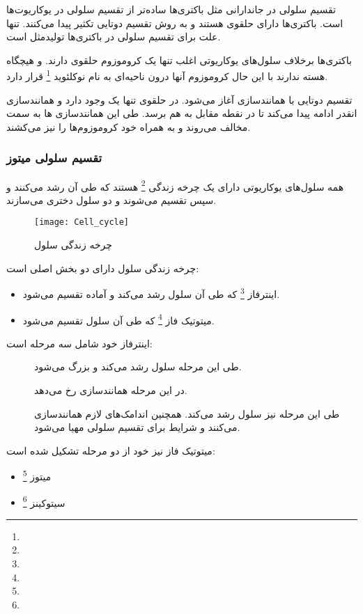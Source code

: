 تقسیم سلولی در جاندارانی مثل باکتری‌ها ساده‌تر از تقسیم سلولی در یوکاریوت‌ها است. باکتری‌ها دارای
حلقوی هستند و به روش تقسیم دوتایی تکثیر پیدا می‌کنند. تنها علت برای تقسیم سلولی در باکتری‌ها تولیدمثل است.

باکتری‌ها برخلاف سلول‌های یوکاریوتی اغلب تنها یک کروموزوم حلقوی دارند. و هیچگاه هسته ندارند با این حال کروموزوم آنها درون ناحیه‌ای به نام نوکلئوید
\footnote{}
قرار دارد.

تقسیم دوتایی با همانندسازی
آغاز می‌شود. در
حلقوی تنها یک
وجود دارد و همانندسازی انقدر ادامه پیدا می‌کند تا در نقطه مقابل به هم برسد. طی این همانندسازی
ها به سمت مخالف می‌روند و به همراه خود کروموزوم‌ها را نیز می‌کشند.

\pagebreak
\subsubsection{تقسیم سلولی میتوز}
همه سلول‌های یوکاریوتی دارای یک چرخه زندگی
\footnote{}
 هستند که طی آن رشد می‌کنند و سپس تقسیم می‌شوند و دو سلول دختری می‌سازند.

\begin{wrapfigure}[12]{l}{7cm}
	\centering
	\texttt{[image: Cell\_cycle]}
	\caption{ چرخه زندگی سلول}
	\label{figure:cellCycle}
\end{wrapfigure}

چرخه زندگی سلول دارای دو بخش اصلی است:
\begin{itemize}
\item اینترفاز
\footnote{}
که طی آن سلول رشد می‌کند و آماده تقسیم می‌شود.
\item میتوتیک فاز
\footnote{}
که طی آن سلول تقسیم می‌شود.
\end{itemize}

اینترفاز خود شامل سه مرحله است:
\begin{description}
\item[]
طی این مرحله سلول رشد می‌کند و بزرگ می‌شود.
\item[]
در این مرحله همانندسازی
رخ می‌دهد.
\item[]
طی این مرحله نیز سلول رشد می‌کند. همچنین اندامک‌های لازم همانندسازی می‌کنند و شرایط برای تقسیم سلولی مهیا می‌شود.
\end{description}

میتوتیک فاز نیز خود از دو مرحله تشکیل شده است:
\begin{itemize}
\item میتوز
\footnote{}
\item سیتوکینز
\footnote{}
\end{itemize}

